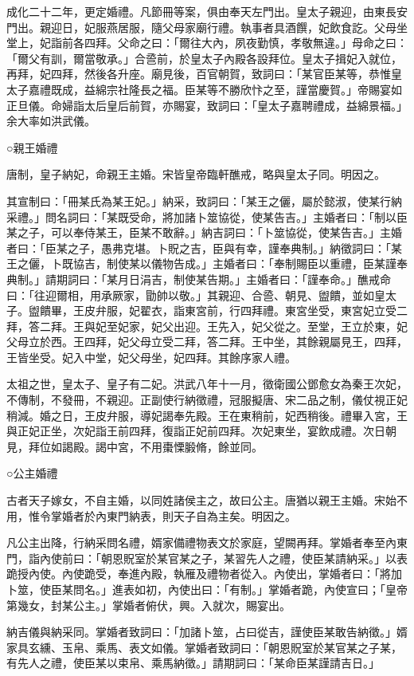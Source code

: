 成化二十二年，更定婚禮。凡節冊等案，俱由奉天左門出。皇太子親迎，由東長安門出。親迎日，妃服燕居服，隨父母家廟行禮。執事者具酒饌，妃飲食訖。父母坐堂上，妃詣前各四拜。父命之曰：「爾往大內，夙夜勤慎，孝敬無違。」母命之曰：「爾父有訓，爾當敬承。」合巹前，於皇太子內殿各設拜位。皇太子揖妃入就位，再拜，妃四拜，然後各升座。廟見後，百官朝賀，致詞曰：「某官臣某等，恭惟皇太子嘉禮既成，益綿宗社隆長之福。臣某等不勝欣忭之至，謹當慶賀。」帝賜宴如正旦儀。命婦詣太后皇后前賀，亦賜宴，致詞曰：「皇太子嘉聘禮成，益綿景福。」余大率如洪武儀。

○親王婚禮

唐制，皇子納妃，命親王主婚。宋皆皇帝臨軒醮戒，略與皇太子同。明因之。

其宣制曰：「冊某氏為某王妃。」納采，致詞曰：「某王之儷，屬於懿淑，使某行納采禮。」問名詞曰：「某既受命，將加諸卜筮協從，使某告吉。」主婚者曰：「制以臣某之子，可以奉侍某王，臣某不敢辭。」納吉詞曰：「卜筮協從，使某告吉。」主婚者曰：「臣某之子，愚弗克堪。卜貺之吉，臣與有幸，謹奉典制。」納徵詞曰：「某王之儷，卜既協吉，制使某以儀物告成。」主婚者曰：「奉制賜臣以重禮，臣某謹奉典制。」請期詞曰：「某月日涓吉，制使某告期。」主婚者曰：「謹奉命。」醮戒命曰：「往迎爾相，用承厥家，勖帥以敬。」其親迎、合巹、朝見、盥饋，並如皇太子。盥饋畢，王皮弁服，妃翟衣，詣東宮前，行四拜禮。東宮坐受，東宮妃立受二拜，答二拜。王與妃至妃家，妃父出迎。王先入，妃父從之。至堂，王立於東，妃父母立於西。王四拜，妃父母立受二拜，答二拜。王中坐，其餘親屬見王，四拜，王皆坐受。妃入中堂，妃父母坐，妃四拜。其餘序家人禮。

太祖之世，皇太子、皇子有二妃。洪武八年十一月，徵衛國公鄧愈女為秦王次妃，不傳制，不發冊，不親迎。正副使行納徵禮，冠服擬唐、宋二品之制，儀仗視正妃稍減。婚之日，王皮弁服，導妃謁奉先殿。王在東稍前，妃西稍後。禮畢入宮，王與正妃正坐，次妃詣王前四拜，復詣正妃前四拜。次妃東坐，宴飲成禮。次日朝見，拜位如謁殿。謁中宮，不用棗慄腶脩，餘並同。

○公主婚禮

古者天子嫁女，不自主婚，以同姓諸侯主之，故曰公主。唐猶以親王主婚。宋始不用，惟令掌婚者於內東門納表，則天子自為主矣。明因之。

凡公主出降，行納采問名禮，婿家備禮物表文於家庭，望闕再拜。掌婚者奉至內東門，詣內使前曰：「朝恩貺室於某官某之子，某習先人之禮，使臣某請納采。」以表跪授內使。內使跪受，奉進內殿，執雁及禮物者從入。內使出，掌婚者曰：「將加卜筮，使臣某問名。」進表如初，內使出曰：「有制。」掌婚者跪，內使宣曰；「皇帝第幾女，封某公主。」掌婚者俯伏，興。入就次，賜宴出。

納吉儀與納采同。掌婚者致詞曰：「加諸卜筮，占曰從吉，謹使臣某敢告納徵。」婿家具玄纁、玉帛、乘馬、表文如儀。掌婚者致詞曰：「朝恩貺室於某官某之子某，有先人之禮，使臣某以束帛、乘馬納徵。」請期詞曰：「某命臣某謹請吉日。」

